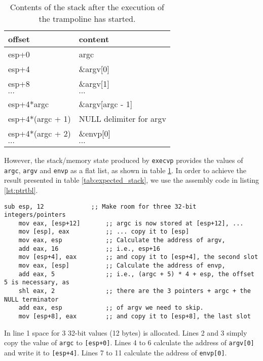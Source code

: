 \documentclass{article}
\begin{document}
\begin{table}[H]
    \centering
    \begin{tabular}{|l|l|}
    \hline
    offset & content       \\ \hline\hline
    esp+0  & argc          \\ \hline
    esp+4  & \&argv{[}0{]} \\ \hline
    esp+8  & \&argv{[}1{]} \\ \hline
    $\cdots$ & $\cdots$ \\ \hline
    esp+4*argc  & \&argv{[}argc - 1{]} \\ \hline
    esp+4*(argc + 1)  & NULL delimiter for argv \\ \hline
    esp+4*(argc + 2)  & \&envp{[}0{]} \\ \hline
    $\cdots$ & $\cdots$ \\ \hline
    \end{tabular}
    \caption{Contents of the stack after the execution of the trampoline has started.}
    \label{tab:given_stack}
\end{table}

However, the stack/memory state produced by \texttt{execvp} provides the values of \texttt{argc}, \texttt{argv} and \texttt{envp} as a flat list, as shown in table \ref{tab:given_stack}. In order to achieve the result presented in table \ref{tab:expected_stack}, we use the assembly code in listing \ref{lst:ptrtbl}.

\begin{lstlisting}[language={[x86masm]Assembler}, caption={Assembly used to prepare the pointer table required by \texttt{a.out} executables}, label={lst:ptrtbl}]
    sub esp, 12             ;; Make room for three 32-bit integers/pointers
    mov eax, [esp+12]       ;; argc is now stored at [esp+12], ...
    mov [esp], eax          ;; ... copy it to [esp]
    mov eax, esp            ;; Calculate the address of argv,
    add eax, 16             ;; i.e., esp+16
    mov [esp+4], eax        ;; and copy it to [esp+4], the second slot
    mov eax, [esp]          ;; Calculate the address of envp,
    add eax, 5              ;; i.e., (argc + 5) * 4 + esp, the offset 5 is necessary, as
    shl eax, 2              ;; there are the 3 pointers + argc + the NULL terminator 
    add eax, esp            ;; of argv we need to skip.
    mov [esp+8], eax        ;; and copy it to [esp+8], the last slot
\end{lstlisting}

In line 1 space for 3 32-bit values (12 bytes) is allocated. Lines 2 and 3 simply copy the value of \texttt{argc} to \texttt{[esp+0]}. Lines 4 to 6 calculate the address of \texttt{argv[0]} and write it to \texttt{[esp+4]}. Lines 7 to 11 calculate the address of \texttt{envp[0]}.
\end{document}

